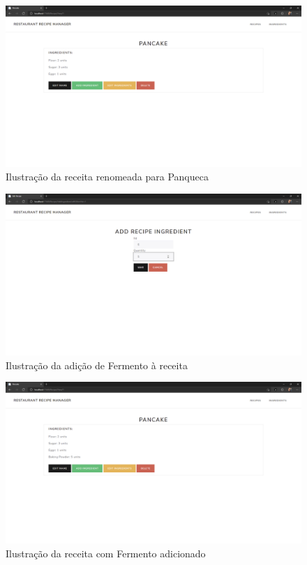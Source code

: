 \FloatBarrier
\begin{figure}[!hbt]
    \centering
    \includegraphics[width=14cm]{Resources/WebApp/Recipes/recipe (4).png}
    \caption{Ilustração da receita renomeada para Panqueca}
    \label{fig:app_rec_4}
\end{figure}
\FloatBarrier
\begin{figure}[!hbt]
    \centering
    \includegraphics[width=14cm]{Resources/WebApp/Recipes/recipe (5).png}
    \caption{Ilustração da adição de Fermento à receita}
    \label{fig:app_rec_5}
\end{figure}
\FloatBarrier
\begin{figure}[!hbt]
    \centering
    \includegraphics[width=14cm]{Resources/WebApp/Recipes/recipe (6).png}
    \caption{Ilustração da receita com Fermento adicionado}
    \label{fig:app_rec_6}
\end{figure}

